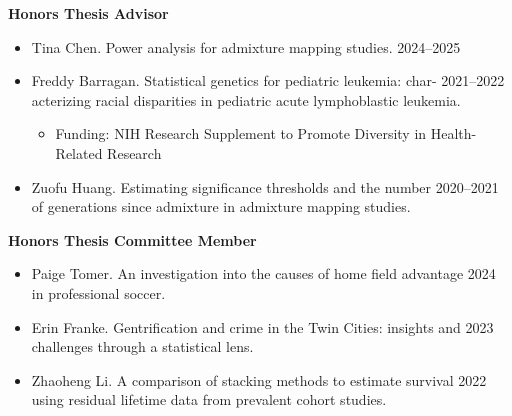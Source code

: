 \documentclass[margin]{res}
\begin{document}
\begin{resume}

\textbf{Honors Thesis Advisor}
\begin{itemize}
\item Tina Chen. Power analysis for admixture mapping studies. \hfill 2024--2025
\item Freddy Barragan. Statistical genetics for pediatric leukemia: char- \hfill 2021--2022 \\ acterizing racial disparities in pediatric acute lymphoblastic leukemia.
	\begin{itemize} \vspace{-0.1cm}
	\item[]\begin{footnotesize}Funding: NIH Research Supplement to Promote Diversity in Health-Related Research\end{footnotesize}
	\end{itemize}
\item Zuofu Huang. Estimating significance thresholds and the number  \hfill 2020--2021 \\of generations since admixture in admixture mapping studies. %
\end{itemize}

\textbf{Honors Thesis Committee Member}
\begin{itemize}
\item Paige Tomer.  An investigation into the causes of home field advantage \hfill 2024 \\ in professional soccer. 
\item Erin Franke. Gentrification and crime in the Twin Cities: insights and \hfill 2023 \\ challenges through a statistical lens. 
\item Zhaoheng Li. A comparison of stacking methods to estimate survival  \hfill 2022 \\ using residual lifetime data from prevalent cohort studies.  %
\end{itemize}


\end{resume}
\end{document}
